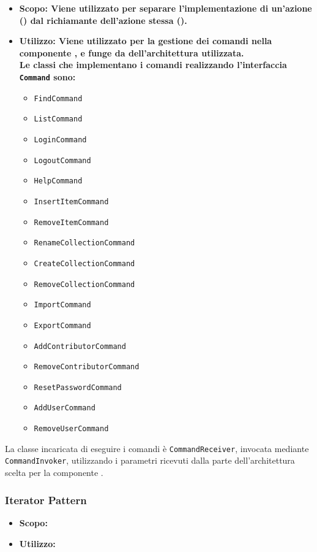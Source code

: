 \documentclass{scalatekids-article}
\begin{document}
\begin{itemize}
\item \bf{Scopo:} Viene utilizzato per separare l'implementazione di un'azione
  () dal richiamante dell'azione stessa ().
\item \bf{Utilizzo:} Viene utilizzato per la gestione dei comandi nella componente
  , e funge da  dell'architettura  utilizzata.\\
  Le classi che implementano i comandi realizzando l'interfaccia \verb=Command= sono:
  \begin{itemize}
  \item \verb=FindCommand=
  \item \verb=ListCommand=
  \item \verb=LoginCommand=
  \item \verb=LogoutCommand=
  \item \verb=HelpCommand=
  \item \verb=InsertItemCommand=
  \item \verb=RemoveItemCommand=
  \item \verb=RenameCollectionCommand=
  \item \verb=CreateCollectionCommand=
  \item \verb=RemoveCollectionCommand=
  \item \verb=ImportCommand=
  \item \verb=ExportCommand=
  \item \verb=AddContributorCommand=
  \item \verb=RemoveContributorCommand=
  \item \verb=ResetPasswordCommand=
  \item \verb=AddUserCommand=
  \item \verb=RemoveUserCommand=
  \end{itemize}
\end{itemize}

La classe incaricata di eseguire i comandi è \verb=CommandReceiver=, invocata mediante
\verb=CommandInvoker=, utilizzando i parametri ricevuti dalla parte 
dell'architettura  scelta per la componente .

\subsubsection{Iterator Pattern}

\begin{itemize}
\item \bf{Scopo:}
\item \bf{Utilizzo:}
\end{itemize}
\end{document}
